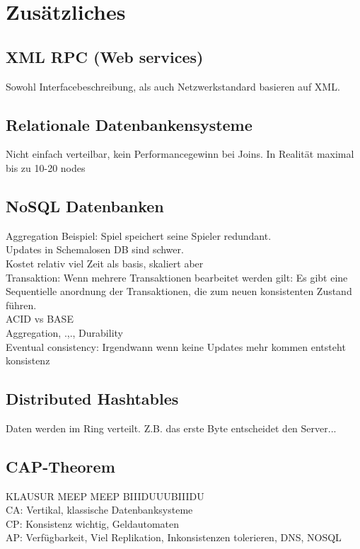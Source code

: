 \documentclass[a4paper]{article}
\begin{document}
\section{Zusätzliches}

\subsection{XML RPC (Web services)}
Sowohl Interfacebeschreibung, als auch Netzwerkstandard basieren auf XML. 
\subsection{Relationale Datenbankensysteme}
Nicht einfach verteilbar, kein Performancegewinn bei Joins. In Realität maximal bis zu 10-20 nodes\\
\subsection{NoSQL Datenbanken}
Aggregation Beispiel: Spiel speichert seine Spieler redundant.\\
Updates in Schemalosen DB sind schwer.\\
Kostet relativ viel Zeit als basis, skaliert aber\\
Transaktion: Wenn mehrere Transaktionen bearbeitet werden gilt: Es gibt eine Sequentielle anordnung der Transaktionen, die zum neuen konsistenten Zustand führen.\\
ACID vs BASE\\
Aggregation, .,., Durability\\
Eventual consistency: Irgendwann wenn keine Updates mehr kommen entsteht konsistenz\\
\subsection{Distributed Hashtables}
Daten werden im Ring verteilt. Z.B. das erste Byte entscheidet den Server...\\
\subsection{CAP-Theorem}
KLAUSUR MEEP MEEP BIIIDUUUBIIIDU\\
CA: Vertikal, klassische Datenbanksysteme\\
CP: Konsistenz wichtig, Geldautomaten\\
AP: Verfügbarkeit, Viel Replikation, Inkonsistenzen tolerieren, DNS, NOSQL\\
\end{document}

